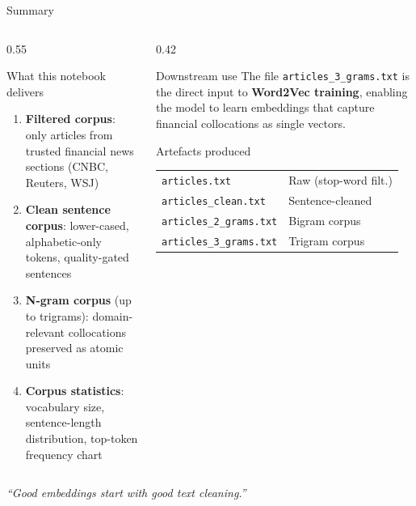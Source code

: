 \documentclass[11pt,aspectratio=169,professionalfonts]{beamer}
\begin{document}
%
%
\begin{frame}{Summary}
\small
  \begin{columns}[T]
    \begin{column}{0.55\textwidth}
      \begin{block}{What this notebook delivers}
        \begin{enumerate}
          \item \textbf{Filtered corpus}: only articles from
                trusted financial news sections (CNBC,
                Reuters, WSJ)
          \item \textbf{Clean sentence corpus}:
                lower-cased, alphabetic-only tokens,
                quality-gated sentences
          \item \textbf{N-gram corpus} (up to trigrams):
                domain-relevant collocations preserved
                as atomic units
          \item \textbf{Corpus statistics}: vocabulary size,
                sentence-length distribution, top-token
                frequency chart
        \end{enumerate}
      \end{block}
    \end{column}
    \begin{column}{0.42\textwidth}
      \begin{alertblock}{Downstream use}
        The file \texttt{articles\_3\_grams.txt} is the
        direct input to \textbf{Word2Vec training},
        enabling the model to learn embeddings that
        capture financial collocations as single vectors.
      \end{alertblock}
      \vspace{0.4em}
      \begin{block}{Artefacts produced}
        \scriptsize
        \begin{tabular}{ll}
          \texttt{articles.txt}          & Raw (stop-word filt.) \\
          \texttt{articles\_clean.txt}   & Sentence-cleaned \\
          \texttt{articles\_2\_grams.txt}& Bigram corpus \\
          \texttt{articles\_3\_grams.txt}& Trigram corpus \\
        \end{tabular}
      \end{block}
    \end{column}
  \end{columns}

  \vspace{0.5em}
  \begin{center}
    \small\textit{``Good embeddings start with good text cleaning.''}
  \end{center}

\end{frame}
\end{document}
